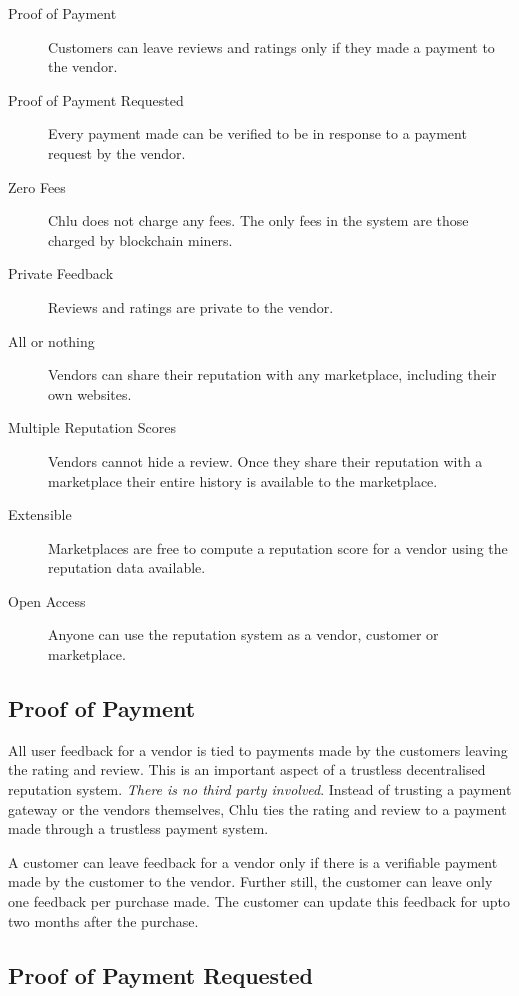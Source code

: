 \documentclass[a4paper]{article}
\begin{document}
\begin{description}
\item[Proof of Payment] Customers can leave reviews and ratings only
  if they made a payment to the vendor.  
\item[Proof of Payment Requested] Every payment made can be verified
  to be in response to a payment request by the vendor.
\item[Zero Fees] Chlu does not charge any fees. The only fees in the
  system are those charged by blockchain miners.
\item[Private Feedback] Reviews and ratings are private to the vendor.
\item[All or nothing] Vendors can share their reputation with any
  marketplace, including their own websites.
\item[Multiple Reputation Scores] Vendors cannot hide a review. Once
  they share their reputation with a marketplace their entire history
  is available to the marketplace.
\item[Extensible] Marketplaces are free to compute a reputation score
  for a vendor using the reputation data available.
\item[Open Access] Anyone can use the reputation system as a vendor,
  customer or marketplace.
\end{description}

\subsection{Proof of Payment}

All user feedback for a vendor is tied to payments made by the
customers leaving the rating and review. This is an important aspect
of a trustless decentralised reputation system. \emph{There is no
  third party involved}. Instead of trusting a payment gateway or the
vendors themselves, Chlu ties the rating and review to a payment made
through a trustless payment system.

A customer can leave feedback for a vendor only if there is a
verifiable payment made by the customer to the vendor. Further still,
the customer can leave only one feedback per purchase made. The
customer can update this feedback for upto two months after the purchase.

\subsection{Proof of Payment Requested}
\end{document}

